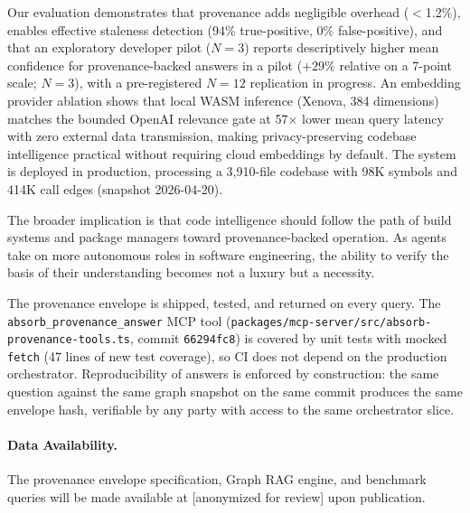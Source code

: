 \documentclass[conference]{IEEEtran}
\begin{document}
Our evaluation demonstrates that provenance adds negligible overhead
($<$1.2\%), enables effective staleness detection (94\% true-positive,
0\% false-positive), and that an exploratory developer pilot ($N{=}3$)
reports descriptively higher mean confidence for provenance-backed answers
in a pilot ($+29\%$ relative on a 7-point scale; $N{=}3$), with a pre-registered $N{=}12$
replication in progress.
An embedding provider ablation shows that local WASM inference (Xenova,
384 dimensions) matches the bounded OpenAI relevance gate at
57$\times$ lower mean query latency with zero external data transmission,
making privacy-preserving codebase intelligence practical without
requiring cloud embeddings by default. The system is deployed in production,
processing a 3,910-file codebase with 98K symbols and 414K call edges (snapshot 2026-04-20).

The broader implication is that code intelligence should follow the path
of build systems and package managers toward provenance-backed
operation. As agents take on more autonomous roles in software
engineering, the ability to verify the basis of their understanding
becomes not a luxury but a necessity.

The provenance envelope is shipped, tested, and returned on every
query. The \texttt{absorb\_provenance\_answer} MCP tool
(\texttt{packages/mcp-server/src/absorb-provenance-tools.ts}, commit
\texttt{66294fc8}) is covered by unit tests with mocked
\texttt{fetch} (47 lines of new test coverage), so CI does not depend
on the production orchestrator. Reproducibility of answers is enforced
by construction: the same question against the same graph snapshot on
the same commit produces the same envelope hash, verifiable by any
party with access to the same orchestrator slice.

\paragraph{Data Availability.} The provenance envelope specification,
Graph RAG engine, and benchmark queries will be made available at
[anonymized for review] upon publication.





\end{document}
